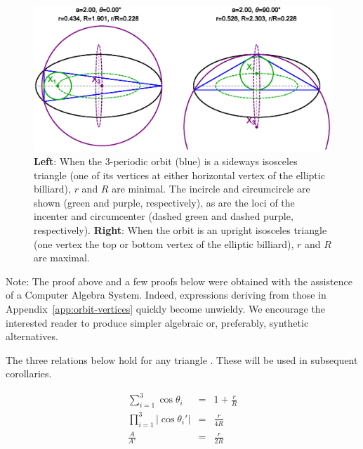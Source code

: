 \documentclass{amsart}
\theoremstyle{definition}
\begin{document}
\begin{figure}[H]
    \centering
    \includegraphics[trim={0 0.5cm 0 0},clip,width=\textwidth]{1060_radii_min_max_orbits}
    \caption{\textbf{Left}: When the 3-periodic orbit (blue) is a sideways isosceles triangle (one of its vertices   at either horizontal vertex of the elliptic billiard), $r$ and $R$ are minimal. The incircle and circumcircle are shown (green and purple, respectively), as are the loci of the incenter and circumcenter (dashed green and dashed purple, respectively). \textbf{Right}: When the orbit is an upright isosceles triangle (one vertex   the top or bottom vertex of the elliptic billiard), $r$ and $R$ are maximal.}
    \label{fig:rR-min-max}
\end{figure}


Note: The proof above and a few proofs below were obtained with the  assistence of   a Computer Algebra System. Indeed, expressions deriving from those in Appendix~\ref{app:orbit-vertices} quickly become unwieldy. We encourage the interested reader to produce simpler algebraic or, preferably, synthetic alternatives.

The three relations below hold for any triangle \cite{johnson29}. These will be used in subsequent corollaries.

\begin{eqnarray}
\sum_{i=1}^{3}{\cos\theta_i}&=&1+\frac{r}{R} \label{eqn:sum-cos} \\
\prod_{i=1}^{3}{|\cos\theta_i'|}&=&\frac{r}{4R} \label{eqn:exc-prod-cos} \\
\frac{A}{A'}&=&\frac{r}{2R}
\label{eqn:area-ratio}
\end{eqnarray}
\end{document}

